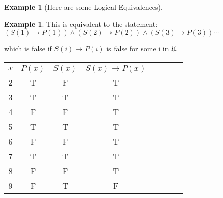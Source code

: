 \documentclass[letterpaper,10pt]{article}
\theoremstyle{plain}
\theoremstyle{definition}
\newtheorem{exmp}[thm]{Example}
\theoremstyle{remark}
\providecommand{\land}{\ensuremath{\wedge}}
\begin{document}
\begin{exmp}[Here are some Logical Equivalences]
\begin{exmp}
This is equivalent to the statement:
$(S(1) \to P(1)) \land (S(2) \to P(2)) \land (S(3) \to P(3)) \cdots$

which is false if $S(i)\to P(i)$ is false for some i in $\mathfrak{U}$.

\begin{center} 
\begin{tabular}{ | c | c | c |c |c |c |c |c |} 
  \hline
 $x$& $P(x)$ & $S(x)$ & $S(x) \to P(x)$ \\
 \hline
  2 & T & F& T\\ 
  3 & T & T & T\\ 
  4 & F & F & T\\ 
  5 & T & T & T\\ 
  6 & F & F & T\\ 
  7 & T & T & T\\ 
  8 & F & F & T\\ 
  9 & F & T & F\\ 
  \hline
\end{tabular}

\end{center}


\end{exmp}
\end{exmp}
\end{document}
